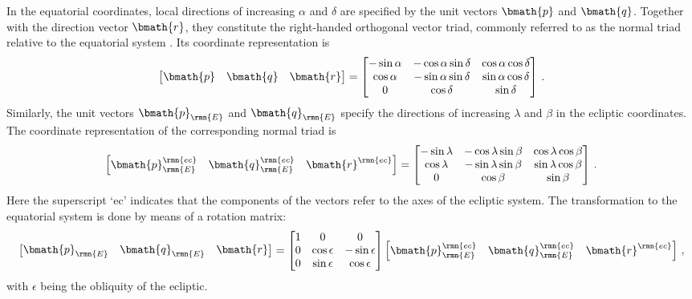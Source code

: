 \documentclass[fleqn,usenatbib,useAMS,usedcolumn]{mnras}
\begin{document}
In the equatorial coordinates, local directions of increasing $\alpha$ and $\delta$ are specified by the unit vectors $\bmath{p}$ and $\bmath{q}$.
Together with the direction vector $\bmath{r}$, they constitute the right-handed orthogonal vector triad, commonly referred to as the normal triad relative to the equatorial system \citep{lindegren2013}. Its coordinate representation is
\begin{equation}
  \begin{bmatrix}
    \bmath{p} & \bmath{q} & \bmath{r}
  \end{bmatrix}
  =
  \begin{bmatrix}
    -\sin\alpha & -\cos\alpha\sin\delta & \cos\alpha\cos\delta \\
     \cos\alpha & -\sin\alpha\sin\delta & \sin\alpha\cos\delta \\
     0          &            \cos\delta & \sin\delta
  \end{bmatrix}\,.
\end{equation}
Similarly, the unit vectors $\bmath{p}_\rmn{E}$ and $\bmath{q}_\rmn{E}$ specify the directions of increasing $\lambda$ and $\beta$ in the ecliptic coordinates. The coordinate representation of the corresponding normal triad is
\begin{equation}
  \begin{bmatrix}
    \bmath{p}_\rmn{E}^\rmn{ec} & \bmath{q}_\rmn{E}^\rmn{ec} & \bmath{r}^\rmn{ec}
  \end{bmatrix}
  =
  \begin{bmatrix}
    -\sin\lambda & -\cos\lambda\sin\beta & \cos\lambda\cos\beta \\
     \cos\lambda & -\sin\lambda\sin\beta & \sin\lambda\cos\beta \\
     0           &             \cos\beta &            \sin\beta
  \end{bmatrix}\,.
\end{equation}
Here the superscript `ec' indicates that the components of the vectors refer to the axes of the ecliptic system. The transformation to the equatorial system is done by means of a rotation matrix:
\begin{equation}
  \begin{bmatrix}
    \bmath{p}_\rmn{E} & \bmath{q}_\rmn{E} & \bmath{r}
  \end{bmatrix}
  =
  \begin{bmatrix}
    1 & 0            & 0             \\
    0 & \cos\epsilon & -\sin\epsilon \\
    0 & \sin\epsilon &  \cos\epsilon
  \end{bmatrix}
    \begin{bmatrix}
    \bmath{p}_\rmn{E}^\rmn{ec} & \bmath{q}_\rmn{E}^\rmn{ec} & \bmath{r}^\rmn{ec}
  \end{bmatrix}\,,
\end{equation}
with $\epsilon$ being the obliquity of the ecliptic.
\end{document}
